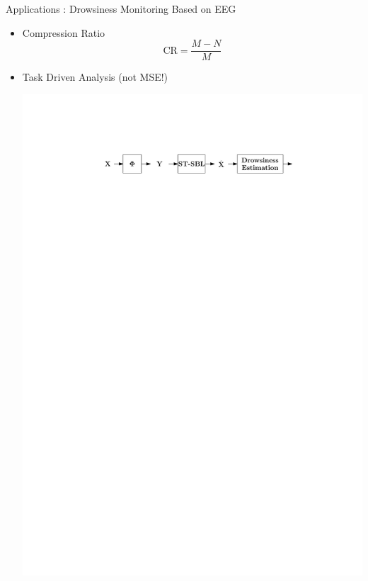 \documentclass[notheorems,table]{beamer}
\begin{document}
\begin{frame}{Applications : Drowsiness Monitoring Based on EEG}
    \begin{itemize}
        \item Compression Ratio
            \[
                \mathrm{CR} = \frac{M-N}{M}
            \]
        \item Task Driven Analysis (not MSE!)
            \centerline{\includegraphics[width=.8\linewidth]{task_driven_drowsy}}
    \end{itemize}

\end{frame}


\end{document}
